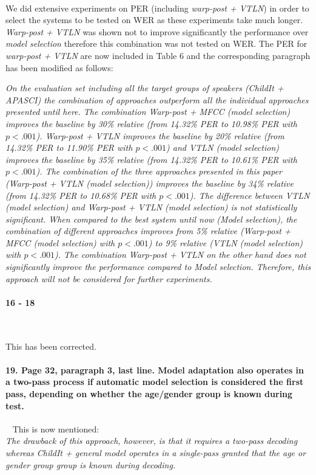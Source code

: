 \documentclass[]{article}
\begin{document}
~

We did extensive experiments on PER (including \textit{warp-post + VTLN}) in order to select the systems to be tested on WER as these experiments take much longer. \textit{Warp-post + VTLN} was shown not to improve significantly the performance over \textit{model selection} therefore this combination was not tested on WER. The PER for \textit{warp-post + VTLN} are now included in Table 6 and the corresponding paragraph has been modified as follows:

\textit{On the evaluation set including all the target groups of speakers (ChildIt + APASCI) the combination of approaches outperform all the individual approaches presented until here. The combination {\em Warp-post + MFCC (model selection)} improves the baseline by 30\% relative (from 14.32\% PER to 10.98\% PER with $p  <.001$).  {\em Warp-post + VTLN} improves the baseline by 20\% relative (from 14.32\% PER to 11.90\% PER with $p  <.001$) and {\em VTLN (model selection)} improves the baseline by 35\% relative (from 14.32\% PER to 10.61\% PER with $p  <.001$). The combination of the three approaches presented in this paper ({\em Warp-post + VTLN (model selection)}) improves the baseline by 34\% relative (from 14.32\% PER to 10.68\% PER with $p  <.001$). The difference between {\em VTLN (model selection)} and {\em Warp-post + VTLN (model selection)} is not statistically significant. When compared to the best system until now ({\em Model selection}), the combination of different approaches improves from 5\% relative ({\em Warp-post + MFCC (model selection)} with $p  <.001$) to 9\% relative ({\em VTLN (model selection)} with $p  <.001$). The combination {\em Warp-post + VTLN} on the other hand does not significantly improve the performance compared to {\em Model selection}. Therefore, this approach will not be considered for further experiments.}


\paragraph{16 - 18}

~

This has been corrected.

\paragraph{19. Page 32, paragraph 3, last line. Model adaptation also operates in a two-pass process if automatic model selection is considered the first pass, depending on whether the age/gender group is known during test.}

~
This is now mentioned:\\
\textit{The drawback of this approach, however, is that it requires a two-pass decoding whereas {\em ChildIt + general model} operates in a single-pass granted that the age or gender group group is known during decoding.}
\end{document}
